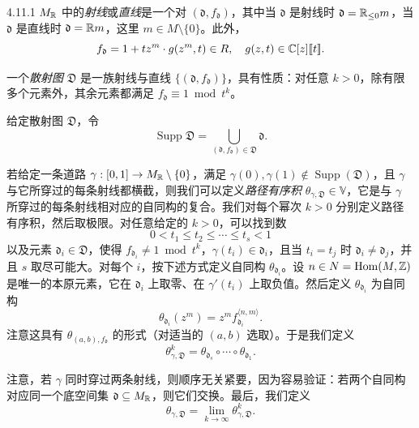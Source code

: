 \begin{definition}{4.11.1}
$M_{\mathbb{R}}$ 中的\emph{射线}或\emph{直线}是一个对 $(\mathfrak{d},f_\mathfrak{d})$，其中当 $\mathfrak{d}$ 是射线时 $\mathfrak{d}=\mathbb{R}_{\le0}m$，当 $\mathfrak{d}$ 是直线时 $\mathfrak{d}=\mathbb{R} m$，这里 $m\in M\setminus\{0\}$。此外，
\[
f_\mathfrak{d}=1+tz^m\cdot g(z^m,t)\in R,\quad g(z,t)\in\mathbb{C}[z][\![t]\!].
\]

一个\emph{散射图} $\mathfrak{D}$ 是一族射线与直线 $\{(\mathfrak{d},f_\mathfrak{d})\}$，具有性质：对任意 $k>0$，除有限多个元素外，其余元素都满足 $f_\mathfrak{d}\equiv1\bmod t^k$。

给定散射图 $\mathfrak{D}$，令
\[
\operatorname{Supp}\mathfrak{D}=\bigcup_{(\mathfrak{d},f_\mathfrak{d})\in\mathfrak{D}}\mathfrak{d}.
\]

若给定一条道路 $\gamma:[0,1]\to M_{\mathbb{R}}\setminus\{0\}$，满足 $\gamma(0),\gamma(1)\notin\operatorname{Supp}(\mathfrak{D})$，且 $\gamma$ 与它所穿过的每条射线都横截，则我们可以定义\emph{路径有序积} $\theta_{\gamma,\mathfrak{D}}\in\mathbb{V}$，它是与 $\gamma$ 所穿过的每条射线相对应的自同构的复合。我们对每个幂次 $k>0$ 分别定义路径有序积，然后取极限。对任意给定的 $k>0$，可以找到数
\[
0<t_1\le t_2\le\cdots\le t_s<1
\]
以及元素 $\mathfrak{d}_i\in\mathfrak{D}$，使得 $f_{\mathfrak{d}_i}\neq1\bmod t^k$，$\gamma(t_i)\in\mathfrak{d}_i$，且当 $t_i=t_j$ 时 $\mathfrak{d}_i\neq\mathfrak{d}_j$，并且 $s$ 取尽可能大。对每个 $i$，按下述方式定义自同构 $\theta_{\mathfrak{d}_i}$。设 $n\in N=\operatorname{Hom}(M,\mathbb{Z})$ 是唯一的本原元素，它在 $\mathfrak{d}_i$ 上取零、在 $\gamma'(t_i)$ 上取负值。然后定义 $\theta_{\mathfrak{d}_i}$ 为自同构
\[
\theta_{\mathfrak{d}_i}(z^m)=z^m f_{\mathfrak{d}_i}^{\langle n,m\rangle}.
\]
注意这具有 $\theta_{(a,b),f_\mathfrak{d}}$ 的形式（对适当的 $(a,b)$ 选取）。于是我们定义
\[
\theta^k_{\gamma,\mathfrak{D}}=\theta_{\mathfrak{d}_s}\circ\cdots\circ\theta_{\mathfrak{d}_1}.
\]
\end{definition}
注意，若 $\gamma$ 同时穿过两条射线，则顺序无关紧要，因为容易验证：若两个自同构对应同一个底空间集 $\mathfrak{d}\subseteq M_{\mathbb{R}}$，则它们交换。最后，我们定义
\[
\theta_{\gamma,\mathfrak{D}}=\lim_{k\to\infty}\theta^k_{\gamma,\mathfrak{D}}.
\]

